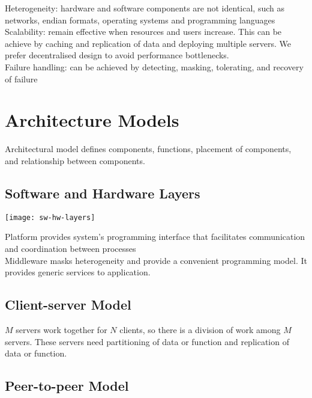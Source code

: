 \begin{multicols*}{2}
\noindent Heterogeneity: hardware and software components are not identical, such as networks, endian formats, operating systems and programming languages\\

\noindent Scalability: remain effective when resources and users increase. This can be achieve by caching and replication of data and deploying multiple servers. We prefer decentralised design to avoid performance bottlenecks. \\

\noindent Failure handling: can be achieved by detecting, masking, tolerating, and recovery of failure

\section{Architecture Models}

\noindent Architectural model defines components, functions, placement of components, and relationship between components.

\subsection{Software and Hardware Layers}

\begin{center}
\texttt{[image: sw-hw-layers]}
\end{center}

\noindent Platform provides system’s programming interface that facilitates communication and coordination between processes\\ 

\noindent Middleware masks heterogeneity and provide a convenient programming model. It provides generic services to application.

\subsection{Client-server Model}

\noindent $M$ servers work together for $N$ clients, so there is a division of work among $M$ servers. These servers need partitioning of data or function and replication of data or function.

\subsection{Peer-to-peer Model}


\end{multicols*}
